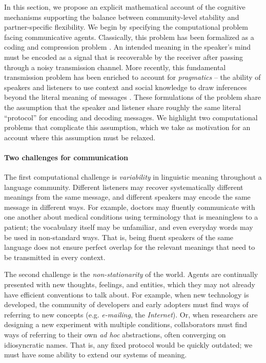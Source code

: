 


In this section, we propose an explicit mathematical account of the cognitive mechanisms supporting the balance between community-level stability and partner-specific flexibility.
We begin by specifying the computational problem facing communicative agents.
Classically, this problem has been formalized as a coding and compression problem \cite{Shannon48}. 
An intended meaning in the speaker's mind must be encoded as a signal that is recoverable by the receiver after passing through a noisy transmission channel.
More recently, this fundamental transmission problem has been enriched to account for \emph{pragmatics} -- the ability of speakers and listeners to use context and social knowledge to draw inferences beyond the literal meaning of messages \cite{FrankeJager16_ProbabilisticPragmatics,goodman_pragmatic_2016}.
These formulations of the problem share the assumption that the speaker and listener share roughly the same literal ``protocol'' for encoding and decoding messages.
We highlight two computational problems that complicate this assumption, which we take as motivation for an account where this assumption must be relaxed. 

\paragraph{Two challenges for communication}

The first computational challenge is \emph{variability} in linguistic meaning throughout a language community. 
Different listeners may recover systematically different meanings from the same message, and different speakers may encode the same message in different ways.
For example, doctors may fluently communicate with one another about medical conditions using terminology that is meaningless to a patient; the vocabulary itself may be unfamiliar, and even everyday words may be used in non-standard ways.
That is, being fluent speakers of the same language does not ensure perfect overlap for the relevant meanings that need to be transmitted in every context.

The second challenge is the \emph{non-stationarity} of the world. 
Agents are continually presented with new thoughts, feelings, and entities, which they may not already have efficient conventions to talk about.
For example, when new technology is developed, the community of developers and early adopters must find ways of referring to new concepts (e.g. \emph{e-mailing}, the \emph{Internet}). 
Or, when researchers are designing a new experiment with multiple conditions, collaborators must find ways of referring to their own \emph{ad hoc} abstractions, often converging on idiosyncratic names.
That is, any fixed protocol would be quickly outdated; we must have some ability to extend our systems of meaning.

